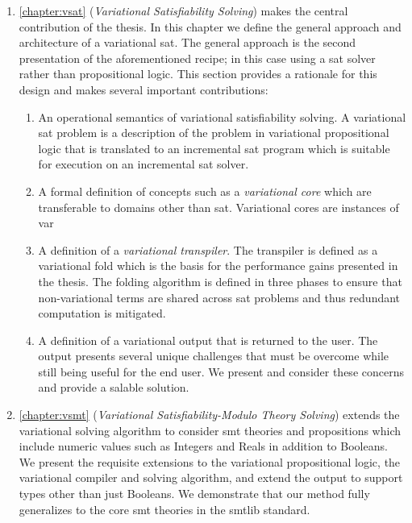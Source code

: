 \begin{enumerate}
  \item \autoref{chapter:vsat} (\emph{Variational Satisfiability Solving}) makes
    the central contribution of the thesis. In this chapter we define the
    general approach and architecture of a variational \acl{sat}. The general
    approach is the second presentation of the aforementioned recipe; in this
    case using a \ac{sat} solver rather than propositional logic. This section
    provides a rationale for this design and makes several important
    contributions:
    \begin{enumerate}
    \item An operational semantics of variational satisfiability solving. A
      variational \ac{sat} problem is a description of the problem in
      variational propositional logic that is translated to an incremental
      \ac{sat} program which is suitable for execution on an incremental
      \ac{sat} solver.
    \item A formal definition of concepts such as a \emph{variational core}
      which are transferable to domains other than \ac{sat}. Variational cores
      are instances of var
    \item A definition of a \emph{variational transpiler}. The transpiler is
      defined as a variational fold which is the basis for the performance gains
      presented in the thesis. The folding algorithm is defined in three phases
      to ensure that non-variational terms are shared across \ac{sat} problems
      and thus redundant computation is mitigated.
    \item A definition of a variational output that is returned to the user. The
      output presents several unique challenges that must be overcome while
      still being useful for the end user. We present and consider these
      concerns and provide a salable solution.
    \end{enumerate}

  \item \autoref{chapter:vsmt} (\emph{Variational Satisfiability-Modulo Theory
      Solving}) extends the variational solving algorithm to consider \ac{smt}
    theories and propositions which include numeric values such as Integers and
    Reals in addition to Booleans. We present the requisite extensions to the
    variational propositional logic, the variational compiler and solving
    algorithm, and extend the output to support types other than just Booleans.
    We demonstrate that our method fully generalizes to the core \ac{smt}
    theories in the \acl{smtlib} standard.


\end{enumerate}
